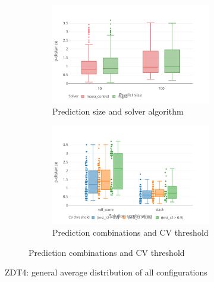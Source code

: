     \begin{figure}
        \centering

        \begin{subfigure}{\textwidth}
            \begin{subfigure}{0.5\textwidth}
                \includegraphics[width=\textwidth]{content/images/conf_zdt4_pred_solver}
                \caption{Prediction size and solver algorithm}
                \label{fig:zdt4_pred_solver}
            \end{subfigure} 
            \begin{subfigure}{0.5\textwidth}
                \includegraphics[width=\textwidth]{content/images/conf_zdt4_comb_valid}
                \caption{Prediction combinations and CV threshold}
                \label{fig:zdt4_comb_valid}
            \end{subfigure}
        \end{subfigure} 

        \caption[ZDT4: general average distribution of all configurations]{ZDT4: general average distribution of all configurations} 
        \label{fig:conf_zdt6}    
    \end{figure}


